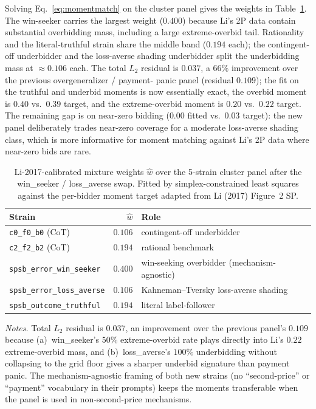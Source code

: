 \documentclass[12pt]{article}
\begin{document}
Solving Eq.~\eqref{eq:momentmatch} on the cluster panel gives the
weights in Table~\ref{tab:li-weights}. The win-seeker carries
the largest weight ($0.400$) because Li's 2P data contain
substantial overbidding mass, including a large extreme-overbid
tail. Rationality and the literal-truthful strain share the middle
band ($0.194$ each); the contingent-off underbidder and the
loss-averse shading underbidder split the underbidding mass at
$\approx 0.106$ each. The total $L_2$ residual is $0.037$, a
$66\%$ improvement over the previous overgeneralizer / payment-
panic panel (residual $0.109$); the fit on the truthful and
underbid moments is now essentially exact, the overbid moment is
$0.40$ vs.\ $0.39$ target, and the extreme-overbid moment is $0.20$
vs.\ $0.22$ target. The remaining gap is on near-zero bidding
($0.00$ fitted vs.\ $0.03$ target): the new panel deliberately
trades near-zero coverage for a moderate loss-averse shading
class, which is more informative for moment matching against Li's
2P data where near-zero bids are rare.

\begin{table}[t]
\centering
\caption{Li-2017-calibrated mixture weights $\widehat{w}$ over
the 5-strain cluster panel after the win\_seeker / loss\_averse
swap. Fitted by simplex-constrained least squares against the
per-bidder moment target adapted from Li (2017) Figure~2 SP.}
\label{tab:li-weights}
\small
\setlength{\tabcolsep}{7pt}
\begin{tabular}{@{}lrl@{}}
\toprule
Strain & $\widehat{w}$ & Role \\
\midrule
\texttt{c0\_f0\_b0} (CoT)               & $0.106$ & contingent-off underbidder \\
\texttt{c2\_f2\_b2} (CoT)               & $0.194$ & rational benchmark \\
\texttt{spsb\_error\_win\_seeker}     & $\mathbf{0.400}$ & win-seeking overbidder (mechanism-agnostic) \\
\texttt{spsb\_error\_loss\_averse}    & $0.106$ & Kahneman--Tversky loss-averse shading \\
\texttt{spsb\_outcome\_truthful}        & $0.194$ & literal label-follower \\
\bottomrule
\end{tabular}

\vspace{0.4em}
\begin{minipage}{0.95\textwidth}
\footnotesize\textit{Notes.} Total $L_2$ residual is
$0.037$, an improvement over the previous panel's $0.109$
because (a)~win\_seeker's $50\%$ extreme-overbid rate plays
directly into Li's $0.22$ extreme-overbid mass, and (b)~loss\_averse's
$100\%$ underbidding without collapsing to the grid floor gives a
sharper underbid signature than payment panic. The
mechanism-agnostic framing of both new strains (no
``second-price'' or ``payment'' vocabulary in their prompts) keeps
the moments transferable when the panel is used in non-second-price
mechanisms.\par
\end{minipage}
\end{table}
\end{document}
